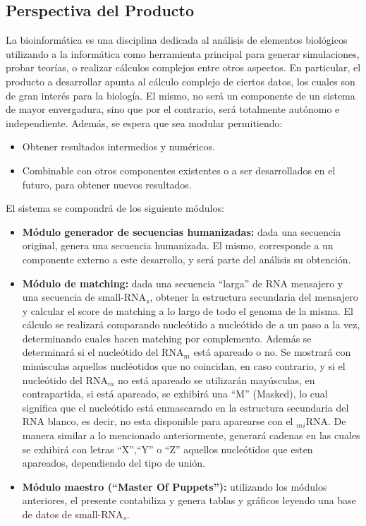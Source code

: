 \documentclass[12pt,a4paper,spanish]{article}
\begin{document}
\subsection{Perspectiva del Producto}
\par La bioinformática es una disciplina dedicada al análisis de elementos biológicos utilizando a la informática como herramienta principal para generar simulaciones, probar teorías, o realizar cálculos complejos entre otros aspectos. En particular, el producto a desarrollar apunta al cálculo complejo de ciertos datos, los cuales son de gran interés para la biología. El mismo, no será un componente de un sistema de mayor envergadura, sino que por el contrario, será totalmente autónomo e independiente. Además, se espera que sea modular permitiendo:
	\begin{itemize} 
		\item Obtener resultados intermedios y numéricos.
		\item Combinable con otros componentes existentes o a ser desarrollados en el futuro, para obtener nuevos resultados.
	\end{itemize}
\par El sistema se compondrá de los siguiente módulos:
	\begin{itemize}
		\item \textbf{Módulo generador de secuencias humanizadas:} dada una secuencia original, genera una secuencia humanizada. El mismo, corresponde a un componente externo a este desarrollo, y será parte del análisis su obtención.

		\item \textbf{Módulo de matching:} dada una secuencia “larga” de RNA mensajero y una secuencia de small-RNA$_s$, 			obtener la estructura secundaria del mensajero y calcular el score de matching a lo largo de todo el genoma de la 			misma. El cálculo se realizará comparando nucleótido a nucleótido de a un paso a la vez, determinando cuales hacen 			matching por complemento. Además se determinará si el nucleótido del RNA$_m$ está apareado o no.
		Se mostrará con minúsculas aquellos nucléotidos que no coincidan, en caso contrario, y si el nucleótido del 		RNA$_m$ no está apareado se utilizarán mayúsculas, en contrapartida, si está apareado, se exhibirá una 		
  	    ``M'' (Masked), lo cual significa que el nucleótido está enmascarado en la estructura secundaria del RNA blanco, 			es decir, no esta disponible para aparearse con el $_m$$_i$RNA.
		De manera similar a lo mencionado anteriormente, generará cadenas en las cuales se exhibirá con letras ``X'',``Y'' 			o ``Z'' aquellos nucleótidos que esten apareados, dependiendo del tipo de unión.

		\item \textbf{Módulo maestro (“Master Of Puppets”):} utilizando los módulos anteriores, el presente contabiliza y 			genera tablas y gráficos leyendo una base de datos de small-RNA$_s$. 
	\end{itemize}
\end{document}

